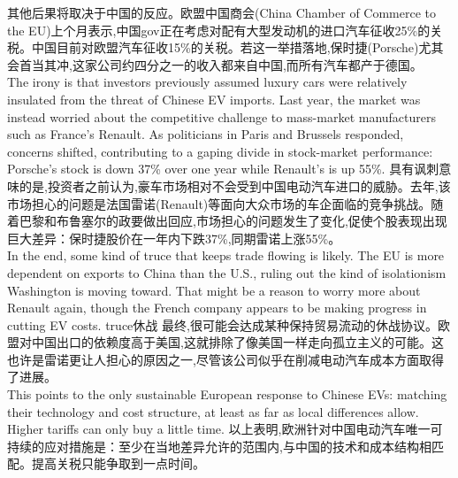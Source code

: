 \documentclass[a4paper,12pt]{article}
\begin{document}
其他后果将取决于中国的反应。欧盟中国商会(China Chamber of Commerce to the EU)上个月表示,中国gov正在考虑对配有大型发动机的进口汽车征收25\%的关税。中国目前对欧盟汽车征收15\%的关税。若这一举措落地,保时捷(Porsche)尤其会首当其冲,这家公司约四分之一的收入都来自中国,而所有汽车都产于德国。
\\The irony is that investors previously assumed luxury cars were relatively insulated from the threat of Chinese EV imports. Last year, the market was instead worried about the competitive challenge to mass-market manufacturers such as France's Renault. As politicians in Paris and Brussels responded, concerns shifted, contributing to a gaping divide in stock-market performance: Porsche's stock is down 37\% over one year while Renault's is up 55\%.
具有讽刺意味的是,投资者之前认为,豪车市场相对不会受到中国电动汽车进口的威胁。去年,该市场担心的问题是法国雷诺(Renault)等面向大众市场的车企面临的竞争挑战。随着巴黎和布鲁塞尔的政要做出回应,市场担心的问题发生了变化,促使个股表现出现巨大差异：保时捷股价在一年内下跌37\%,同期雷诺上涨55\%。
\\In the end, some kind of truce that keeps trade flowing is likely. The EU is more dependent on exports to China than the U.S., ruling out the kind of isolationism Washington is moving toward. That might be a reason to worry more about Renault again, though the French company appears to be making progress in cutting EV costs.   truce休战
最终,很可能会达成某种保持贸易流动的休战协议。欧盟对中国出口的依赖度高于美国,这就排除了像美国一样走向孤立主义的可能。这也许是雷诺更让人担心的原因之一,尽管该公司似乎在削减电动汽车成本方面取得了进展。
\\This points to the only sustainable European response to Chinese EVs: matching their technology and cost structure, at least as far as local differences allow. Higher tariffs can only buy a little time.
以上表明,欧洲针对中国电动汽车唯一可持续的应对措施是：至少在当地差异允许的范围内,与中国的技术和成本结构相匹配。提高关税只能争取到一点时间。
\end{document}
